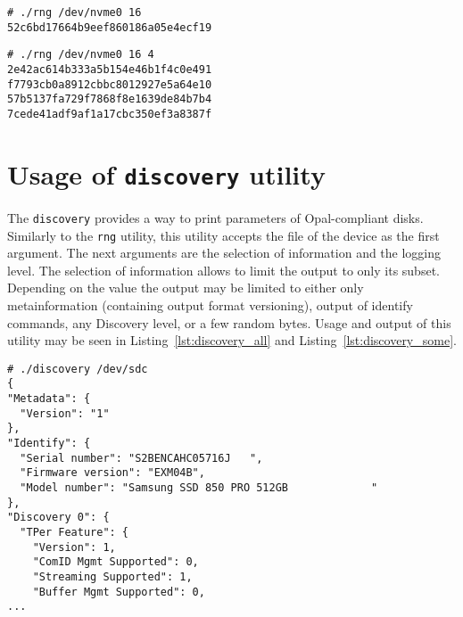 \begin{lstlisting}[caption=Execution specifying number of bytes per session,label={lst:rng_one}]
# ./rng /dev/nvme0 16
52c6bd17664b9eef860186a05e4ecf19
\end{lstlisting}

\begin{lstlisting}[caption=Execution specifying number of sessions,label={lst:rng_two}]
# ./rng /dev/nvme0 16 4
2e42ac614b333a5b154e46b1f4c0e491
f7793cb0a8912cbbc8012927e5a64e10
57b5137fa729f7868f8e1639de84b7b4
7cede41adf9af1a17cbc350ef3a8387f
\end{lstlisting}



\section{Usage of \texttt{discovery} utility}

The \verb|discovery| provides a way to print parameters of Opal-compliant disks. Similarly to the \verb|rng| utility, this utility accepts the file of the device as the first argument. The next arguments are the selection of information and the logging level. The selection of information allows to limit the output to only its subset. Depending on the value the output may be limited to either only metainformation (containing output format versioning), output of identify commands, any Discovery level, or a few random bytes. Usage and output of this utility may be seen in Listing~\ref{lst:discovery_all} and Listing~\ref{lst:discovery_some}.




\begin{lstlisting}[caption=Execution providing entire output,label={lst:discovery_all}]
# ./discovery /dev/sdc
{
"Metadata": {
  "Version": "1"
},
"Identify": {
  "Serial number": "S2BENCAHC05716J   ",
  "Firmware version": "EXM04B",
  "Model number": "Samsung SSD 850 PRO 512GB             "
},
"Discovery 0": {
  "TPer Feature": {
    "Version": 1,
    "ComID Mgmt Supported": 0,
    "Streaming Supported": 1,
    "Buffer Mgmt Supported": 0,
...
\end{lstlisting}

